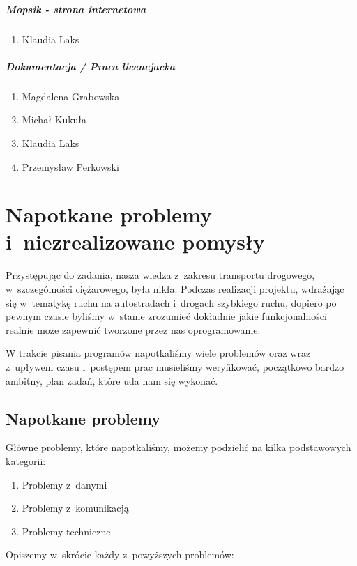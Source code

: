 \paragraph{Mopsik - strona internetowa}
\begin{enumerate}
\item Klaudia Laks
\end{enumerate}

\paragraph{Dokumentacja / Praca licencjacka}
\begin{enumerate}
\item Magdalena Grabowska
\item Michał Kukuła
\item Klaudia Laks
\item Przemysław Perkowski
\end{enumerate}

\chapter{Napotkane problemy i~niezrealizowane pomysły}

Przystępując do zadania, nasza wiedza z~zakresu transportu drogowego, w~szczególności ciężarowego, była nikła. Podczas realizacji projektu, wdrażając się  w~tematykę ruchu na autostradach i~drogach szybkiego ruchu, dopiero po pewnym czasie byliśmy w~stanie zrozumieć dokładnie jakie funkcjonalności realnie może zapewnić tworzone przez nas oprogramowanie.

W trakcie pisania programów napotkaliśmy wiele problemów oraz wraz z~upływem czasu i~postępem prac musieliśmy weryfikować, początkowo bardzo ambitny, plan zadań, które uda nam się wykonać.

\section{Napotkane problemy}
Główne problemy, które napotkaliśmy, możemy podzielić na kilka podstawowych kategorii:
\begin{enumerate}
\item Problemy z~danymi
\item Problemy z~komunikacją
\item Problemy techniczne
\end{enumerate}
Opiszemy w~skrócie każdy z~powyższych problemów:
